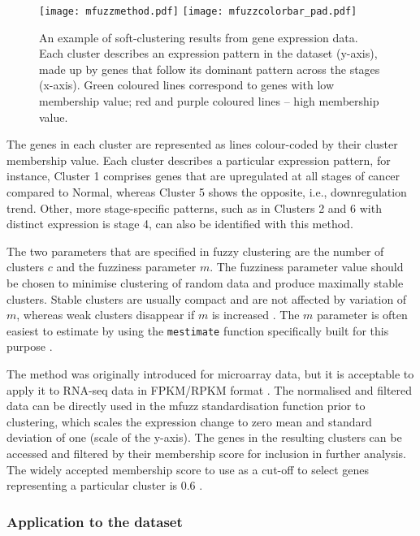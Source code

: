         \begin{figure}[!h]
        \texttt{[image: mfuzzmethod.pdf]}\hfill
        \texttt{[image: mfuzzcolorbar\_pad.pdf]}
        \caption{An example of soft-clustering results from gene expression data. Each cluster describes an expression pattern in the dataset (y-axis), made up by genes that follow its dominant pattern across the stages (x-axis).  Green coloured lines correspond to genes with low membership value; red and purple coloured lines -- high membership value.}
        \label{fig:mfuzzmethod}
        \end{figure}
            
 The genes in each cluster are represented as lines colour-coded by their cluster membership value.  Each cluster describes a particular expression pattern, for instance, Cluster 1 comprises genes that are upregulated at all stages of cancer compared to Normal, whereas Cluster 5 shows the opposite, i.e., downregulation trend. Other, more stage-specific patterns, such as in Clusters 2 and 6 with distinct expression is stage 4, can also be identified with this method. 
 
  
The two parameters that are specified in fuzzy clustering are the number of clusters $c$ and the fuzziness parameter $m$. The fuzziness parameter value should be chosen to minimise clustering of random data and produce maximally stable clusters. Stable clusters are usually compact and are not affected by variation of $m$, whereas weak clusters disappear if $m$ is increased \cite{Kumar2007Mfuzz:Data}. The $m$ parameter is often easiest to estimate by using the \texttt{mestimate} function specifically built for this purpose \cite{Schwammle2010AAnalysis}. 
 
  
 
The method was originally introduced for microarray data, but it is acceptable to apply it to RNA-seq data in FPKM/RPKM format \cite{Futschik2007MfuzzHomepage}.  The normalised and filtered data can be directly used in the mfuzz standardisation function prior to clustering, which scales the expression change to zero mean and standard deviation of one (scale of the y-axis).
The genes in the resulting clusters can be accessed and filtered by their membership score for inclusion in further analysis. The widely accepted membership score to use as a cut-off to select genes representing a particular cluster is 0.6 \cite{chen2016time}. 

\subsubsection{Application to the dataset}

